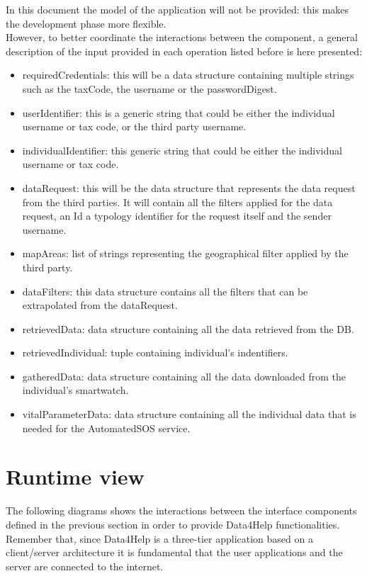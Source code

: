 In this document the model of the application will not be provided: this makes the development phase more flexible.\\
However, to better coordinate the interactions between the component, a general description of the input provided in each operation listed before is here presented:
\begin{itemize}
\item requiredCredentials: this will be a data structure containing multiple strings such as the taxCode, the username or the passwordDigest.
\item userIdentifier: this is a generic string that could be either the individual username or tax code, or the third party username.
\item individualIdentifier: this generic string that could be either the individual username or tax code.
\item dataRequest: this will be the data structure that represents the data request from the third parties. It will contain all the filters applied for the data request, an Id a typology identifier for the request itself and the sender username.
\item mapAreas: list of strings representing the geographical filter applied by the third party.
\item dataFilters: this data structure contains all the filters that can be extrapolated from the dataRequest.
\item retrievedData: data structure containing all the data retrieved from the DB.
\item retrievedIndividual: tuple containing individual's indentifiers.
\item gatheredData: data structure containing all the data downloaded from the individual's smartwatch.
\item vitalParameterData: data structure containing all the individual data that is needed for the AutomatedSOS service.
\end{itemize}




\section{Runtime view}
The following diagrams shows the interactions between the interface components defined in the previous section in  order to provide Data4Help functionalities. Remember that, since Data4Help is a three-tier application based on a client/server architecture it is fundamental that the user applications and the server are connected to the internet.
